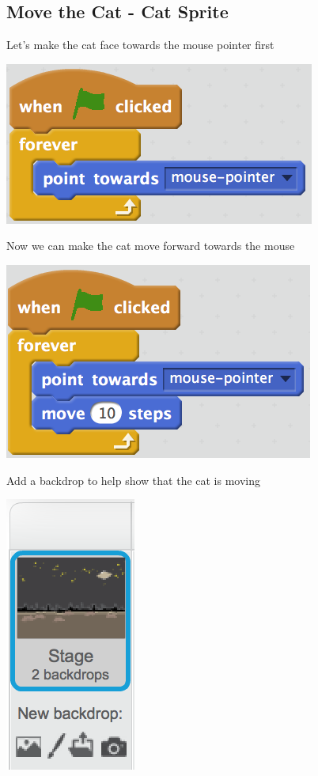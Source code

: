 \documentclass[12pt]{article}
\begin{document}
\subsection*{Move the Cat - Cat Sprite}
	\begin{itemize}
		\item Let’s make the cat face towards the mouse pointer first
		\begin{center}
			\item[] \includegraphics[scale=1.0]{./Images/dragon1.png}
		\end{center}
		\newpage
		\item Now we can make the cat move forward towards the mouse
		\begin{center}
			\item[] \includegraphics[scale=1.0]{./Images/dragon2.png}
		\end{center}
		\item Add a backdrop to help show that the cat is moving
		\begin{center}
			\item[] \includegraphics[scale=1.0]{./Images/dragon3.png}
		\end{center}
	\end{itemize}
	
\end{document}
